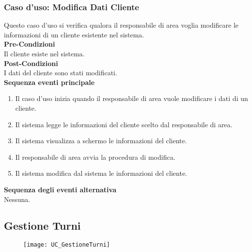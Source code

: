 \documentclass[green, fancy, 11pt]{elegantbook}
\begin{document}
\subsubsection{Caso d'uso: Modifica Dati Cliente}
\noindent
Questo caso d’uso si verifica qualora il responsabile di area voglia modificare le informazioni di un cliente esistente nel sistema.\\
\textbf{Pre-Condizioni}\\
Il cliente esiste nel sistema.\\
\textbf{Post-Condizioni}\\
I dati del cliente sono stati modificati.\\
\textbf{Sequenza eventi principale}
\begin{enumerate}
	\item Il caso d’uso inizia quando il responsabile di area vuole modificare i dati di un cliente.
	\item Il sistema legge le informazioni del cliente scelto dal responsabile di area.
	\item Il sistema visualizza a schermo le informazioni del cliente.
	\item Il responsabile di area avvia la procedura di modifica.
	\item Il sistema modifica dal sistema le informazioni del cliente.
\end{enumerate}
\textbf{Sequenza degli eventi alternativa}\\
Nessuna.
\newpage

\subsection{Gestione Turni}
\begin{figure}[H]
	\texttt{[image: UC\_GestioneTurni]}
\end{figure}
\end{document}
